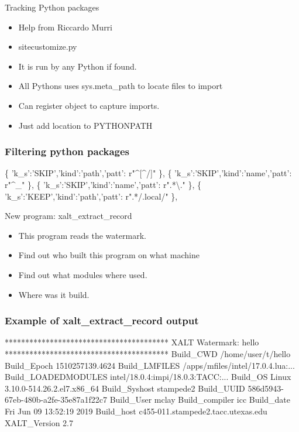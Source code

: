 \documentclass{beamer}
\begin{document}
\begin{frame}{Tracking Python packages}
  \begin{itemize}
    \item Help from Riccardo Murri
    \item sitecustomize.py
    \item It is run by any Python if found.
    \item All Pythons uses sys.meta\_path to locate files to import
    \item Can register object to capture imports.
    \item Just add location to PYTHONPATH
  \end{itemize}
\end{frame}

\begin{frame}[fragile]
    \frametitle{Filtering python packages}
 {\small
    \begin{semiverbatim}
\{ 'k\_s':'SKIP','kind':'path','patt': r"^[^/]" \},
\{ 'k\_s':'SKIP','kind':'name','patt': r"^_"    \},
\{ 'k\_s':'SKIP','kind':'name','patt': r".*\textbackslash." \},
\{ 'k\_s':'KEEP','kind':'path','patt': r".*/.local/" \},
    \end{semiverbatim}
}
\end{frame}

\begin{frame}{New program: xalt\_extract\_record}
  \begin{itemize}
    \item This program reads the watermark.
    \item Find out who built this program on what machine
    \item Find out what modules where used.
    \item Where was it build. 
  \end{itemize}
\end{frame}

\begin{frame}[fragile]
    \frametitle{Example of xalt\_extract\_record output}
 {\small
    \begin{semiverbatim}
****************************************
XALT Watermark: hello
****************************************
Build\_CWD            /home/user/t/hello
Build\_Epoch          1510257139.4624
Build\_LMFILES        /apps/mfiles/intel/17.0.4.lua:...
Build\_LOADEDMODULES  intel/18.0.4:impi/18.0.3:TACC:...
Build\_OS             Linux 3.10.0-514.26.2.el7.x86_64
Build\_Syshost        stampede2
Build\_UUID           586d5943-67eb-480b-a2fe-35e87a1f22c7
Build\_User           mclay
Build\_compiler       icc
Build\_date           Fri Jun 09 13:52:19 2019
Build\_host           c455-011.stampede2.tacc.utexas.edu
XALT\_Version         2.7
    \end{semiverbatim}
}
\end{frame}
\end{document}

